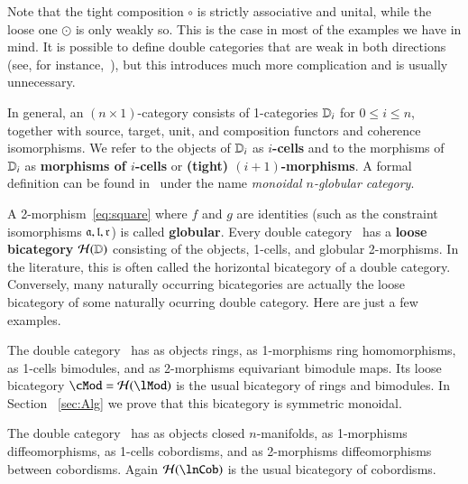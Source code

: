 Note that the tight composition $\circ$ is strictly associative and
unital, while the loose one $\odot$ is only weakly so.  This is
the case in most of the examples we have in mind.  It is possible to
define double categories that are weak in both directions (see, for
instance,~\cite{verity:base-change}), but this introduces much more
complication and is usually unnecessary.

\begin{rmk}\label{rmk:monglob}
  In general, an $(n\times 1)$-category consists of 1-categories
  $\mathbb{D}_i$ for $0\le i\le n$, together with source, target, unit, and
  composition functors and coherence isomorphisms.  We refer to the
  objects of $\mathbb{D}_i$ as \textbf{$i$-cells} and to the morphisms of
  $\mathbb{D}_i$ as \textbf{morphisms of $i$-cells} or \textbf{(tight)
    $(i+1)$-morphisms}.  A formal definition can be found
  in~\cite{batanin:monglob} under the name \emph{monoidal $n$-globular
    category}.
\end{rmk}


A 2-morphism~\eqref{eq:square} where $f$ and $g$ are identities (such
as the constraint isomorphisms $\mathfrak{a},\mathfrak{l},\mathfrak{r}$) is called
\textbf{globular}.  Every double category \lD\ has a
\textbf{loose bicategory} $\mathcal{H}(\mathbb{D})$ consisting of the objects,
1-cells, and globular 2-morphisms.  In the literature, this is often called the horizontal bicategory of a double category. Conversely, many naturally
occurring bicategories are actually the loose bicategory of some
naturally ocurring double category.  Here are just a few examples.

\begin{eg}
  The double category \lMod\ has as objects rings, as 1-morphisms ring
  homomorphisms, as 1-cells bimodules, and as 2-morphisms equivariant
  bimodule maps.  Its loose bicategory $\cMod = \cH(\lMod)$ is
  the usual bicategory of rings and bimodules. In Section ~\ref{sec:Alg} we prove that this bicategory is symmetric monoidal.
\end{eg}

\begin{eg}
  The double category \lnCob\ has as objects closed $n$-manifolds, as
  1-morphisms diffeomorphisms, as 1-cells cobordisms, and as
  2-morphisms diffeomorphisms between cobordisms.  Again $\cH(\lnCob)$
  is the usual bicategory of cobordisms.
\end{eg}


